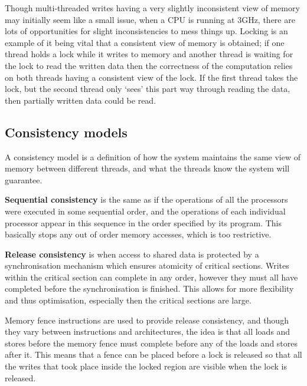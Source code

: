 Though multi-threaded writes having a very slightly inconsistent view
of memory may initially seem like a small issue, when a CPU is running
at $3\si{\giga\hertz}$, there are lots of opportunities for slight
inconsistencies to mess things up. Locking is an example of it being
vital that a consistent view of memory is obtained; if one thread
holds a lock while it writes to memory and another thread is waiting
for the lock to read the written data then the correctness of the
computation relies on both threads having a consistent view of the
lock. If the first thread takes the lock, but the second thread only
`sees' this part way through reading the data, then partially written
data could be read.

\subsection{Consistency models}

A consistency model is a definition of how the system maintains the
same view of memory between different threads, and what the threads
know the system will guarantee.

\textbf{Sequential consistency} is the same as if the operations
of all the processors were executed in some sequential order, and the
operations of each individual processor appear in this sequence in the
order specified by its program. This basically stops any out of order
memory accesses, which is too restrictive.

\textbf{Release consistency} is when access to shared data is
protected by a synchronisation mechanism which ensures atomicity of
critical sections. Writes within the critical section can complete in
any order, however they must all have completed before the
synchronisation is finished. This allows for more flexibility and
thus optimisation, especially then the critical sections are large.


Memory fence instructions are used to provide release consistency, and
though they vary between instructions and architectures, the idea is
that all loads and stores before the memory fence must complete before
any of the loads and stores after it. This means that a fence can be
placed before a lock is released so that all the writes that took
place inside the locked region are visible when the lock is released.

